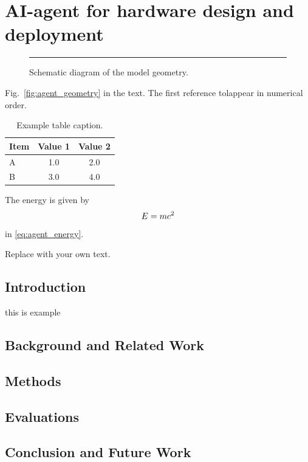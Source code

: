 \section{AI-agent for hardware design and deployment}

\begin{figure}[htbp]
  \centering
  \rule{0.7\textwidth}{3cm}   %
  \caption{Schematic diagram of the model geometry.}
  \label{fig:geometry}
\end{figure}

Fig.~\ref{fig:agent_geometry} in the text. The first reference tolappear in numerical order.

\begin{table}[htbp]
  \centering
  \caption{Example table caption.}
  \begin{tabular}{@{}lcc@{}}
    \toprule
    Item & Value 1 & Value 2 \\
    \midrule
    A & 1.0 & 2.0 \\
    B & 3.0 & 4.0 \\
    \bottomrule
  \end{tabular}
  \label{abel{tab:agent_example}}
\end{table}

The energy is given by
\begin{equation}
  E = mc^{2}
  \label{\label{eq:agent_energy}}
\end{equation}
in \eqref{eq:agent_energy}.

Replace with your own text.


\subsection{Introduction}

this is example~\cite{dirac1931}

\subsection{Background and Related Work}
\subsection{Methods}
\subsection{Evaluations}
\subsection{Conclusion and Future Work}
